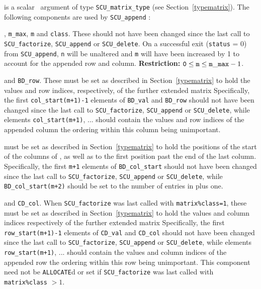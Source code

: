 \documentclass{galahad}
\newcommand{\packagename}{SCU}
\begin{document}
\vspace*{-2mm}
\begin{description}
 is a scalar \intentinout\ argument of type 
{\tt \packagename\_matrix\_type} 
(see Section~\ref{typematrix}). The following components are used by 
{\tt \packagename\_append} : 
 
\begin{description} 
, {\tt m\_max}, {\tt m} and {\tt class}.
These should not have been changed since the last call to 
{\tt \packagename\_factorize}, {\tt \packagename\_append} or 
{\tt \packagename\_delete}. 
On a successful exit ({\tt status} = 0) from {\tt \packagename\_append},  
{\tt n} will be unaltered and {\tt m} will have 
been increased by 1 to account for the appended row and column. 
{\bf Restriction:} ${\tt 0} \leq {\tt m} \leq {\tt m\_max}-1$.
 
 and {\tt BD\_row}. These must be set as described  
in Section~\ref{typematrix} to hold the values and row indices, respectively, 
of the further extended matrix  
Specifically, the first {\tt col\_start(m+1)-1} elements 
of {\tt BD\_val} and {\tt BD\_row} should not have been changed since the 
last call to 
{\tt \packagename\_factorize}, {\tt \packagename\_append} or 
{\tt \packagename\_delete}, while 
elements {\tt col\_start(m+1)}, ... should contain 
the values and row indices of the appended column 
the ordering within this column being unimportant. 
 
 must be set as described in 
Section~\ref{typematrix} to hold the 
positions of the start of the columns of , as well as to the first 
position past the end of the last column. 
Specifically, the first {\tt m+1} elements 
of {\tt BD\_col\_start} should not have been changed since the last call to 
{\tt \packagename\_factorize}, {\tt \packagename\_append} or 
{\tt \packagename\_delete}, while 
{\tt BD\_col\_start(m+2)} should be set to the number of entries in 
 plus one. 
 
 and {\tt CD\_col}. 
When {\tt \packagename\_factorize} was last called with {\tt matrix\%class=1}, 
these must be set as described in Section~\ref{typematrix} to hold the 
values and column indices respectively of the further extended matrix  
Specifically, the first {\tt row\_start(m+1)-1} elements 
of {\tt CD\_val} and {\tt CD\_col} should not have been changed since the 
last call to 
{\tt \packagename\_factorize}, {\tt \packagename\_append} or 
{\tt \packagename\_delete}, while 
elements {\tt row\_start(m+1)}, ... should contain 
the values and column indices of the appended row 
the ordering within this row being unimportant. 
This component need not be {\tt ALLOCATE}d or set if
{\tt \packagename\_fac\-torize} was last called with {\tt matrix\%class} $> 1$. 
 

\end{description}
\end{description}
\end{document}
